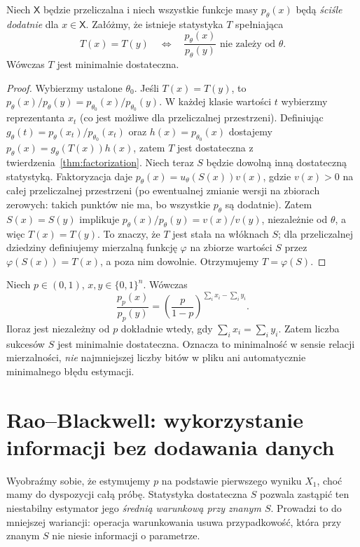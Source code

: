 \begin{stwierdzenie}
\label{prop:minimal-discrete}
Niech $\mathsf X$ będzie przeliczalna i niech wszystkie funkcje
masy $p_\theta(x)$ będą \emph{ściśle dodatnie} dla $x\in\mathsf X$.
Załóżmy, że istnieje statystyka $T$ spełniająca
\[
T(x)=T(y)\quad\Longleftrightarrow\quad
\frac{p_\theta(x)}{p_\theta(y)}\text{ nie zależy od }\theta.
\]
Wówczas $T$ jest minimalnie dostateczna.
\end{stwierdzenie}
\begin{proof}
Wybierzmy ustalone $\theta_0$. Jeśli $T(x)=T(y)$, to
$p_\theta(x)/p_\theta(y)=p_{\theta_0}(x)/p_{\theta_0}(y)$.
W każdej klasie wartości $t$ wybierzmy reprezentanta $x_t$
(co jest możliwe dla przeliczalnej przestrzeni). Definiując
$g_\theta(t)=p_\theta(x_t)/p_{\theta_0}(x_t)$ oraz
$h(x)=p_{\theta_0}(x)$ dostajemy
$p_\theta(x)=g_\theta(T(x))h(x)$, zatem $T$ jest dostateczna
z twierdzenia~\ref{thm:factorization}.
Niech teraz $S$ będzie dowolną inną dostateczną statystyką.
Faktoryzacja daje
$p_\theta(x)=u_\theta(S(x))v(x)$, gdzie $v(x)>0$
na całej przeliczalnej przestrzeni (po ewentualnej zmianie
wersji na zbiorach zerowych: takich punktów nie ma, bo wszystkie
$p_\theta$ są dodatnie). Zatem $S(x)=S(y)$ implikuje
$p_\theta(x)/p_\theta(y)=v(x)/v(y)$, niezależnie od $\theta$,
a więc $T(x)=T(y)$. To znaczy, że $T$ jest stała na włóknach
$S$; dla przeliczalnej dziedziny definiujemy mierzalną funkcję
$\varphi$ na zbiorze wartości $S$ przez $\varphi(S(x))=T(x)$,
a poza nim dowolnie. Otrzymujemy $T=\varphi(S)$.
\end{proof}

\begin{przyklad}
Niech $p\in(0,1)$, $x,y\in\{0,1\}^n$. Wówczas
\[
\frac{p_p(x)}{p_p(y)}
=\left(\frac p{1-p}\right)^{\sum_i x_i-\sum_i y_i}.
\]
Iloraz jest niezależny od $p$ dokładnie wtedy, gdy
$\sum_i x_i=\sum_i y_i$. Zatem liczba sukcesów $S$ jest
minimalnie dostateczna. Oznacza to minimalność w sensie
relacji mierzalności, \emph{nie} najmniejszej liczby bitów w pliku
ani automatycznie minimalnego błędu estymacji.
\end{przyklad}

\section{Rao--Blackwell: wykorzystanie informacji bez dodawania danych}
Wyobraźmy sobie, że estymujemy $p$ na podstawie pierwszego wyniku
$X_1$, choć mamy do dyspozycji całą próbę. Statystyka dostateczna
$S$ pozwala zastąpić ten niestabilny estymator jego \emph{średnią
warunkową przy znanym $S$}. Prowadzi to do mniejszej wariancji:
operacja warunkowania usuwa przypadkowość, która przy znanym $S$
nie niesie informacji o parametrze.

